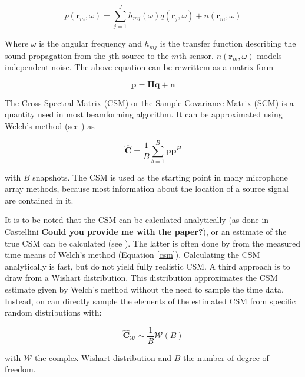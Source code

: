 \documentclass[11pt,a4paper,twoside]{report}
\begin{document}
\begin{equation}
    p(\mathbf{r}_m, \omega) = \sum_{j = 1}^{J} h_{mj}(\omega)q(\mathbf{r}_j, \omega) + n(\mathbf{r}_m, \omega)
\end{equation}

Where $\omega$ is the angular frequency and $h_{mj}$ is the transfer function  describing the sound propagation from the $j$th source to the $m$th sensor. $n(\mathbf{r}_m, \omega)$ models independent noise. The above equation can be rewrittem as a matrix form

\begin{equation}
    \mathbf{p} = \mathbf{H} \mathbf{q} + \mathbf{n}
\end{equation}

The Cross Spectral Matrix (CSM) or the Sample Covariance Matrix (SCM) is a quantity used in most beamforming algorithm. It can be approximated using Welch's method (see \cite{welch1967use}) as


\begin{equation}
    \label{csm}
    \hat{\mathbf{C}} = \frac{1}{B} \sum_{b = 1}^{B} \mathbf{p}\mathbf{p}^H
\end{equation}

with $B$ snapshots. The CSM is used as the starting point in many microphone array methods, because most information about the location of a source signal are contained in it.

It is to be noted that the CSM can be calculated analytically (as done in Castellini \textbf{Could you provide me with the paper?}), or an estimate of the true CSM can be calculated (see \cite{kujawski2022fast}). The latter is often done by from the measured time means of Welch's method (Equation \ref{csm}). Calculating the CSM analytically is fast, but do not yield fully realistic CSM. A third approach is to draw from a Wishart distribution. This distribution approximates the CSM estimate given by Welch's method without the need to sample the time data. Instead, on can directly sample the elements of the estimated CSM from specific random distributions with:

\begin{equation}
    \hat{\mathbf{C}}_{\mathcal{W}} \sim \frac{1}{B}\mathcal{W}(B)
\end{equation}

with $\mathcal{W}$ the complex Wishart distribution and $B$ the number of degree of freedom.
\end{document}
